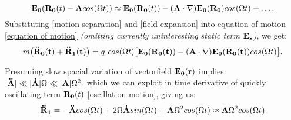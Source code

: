 \begin{equation}
	\label{field expansion}
	\vb{E_0}(\vb{R_0}(t) - \vb{A} cos(\Omega t)) \approx \vb{E_0}(\vb{R_0}(t)) -(\vb{A} \cdot \nabla) \vb{E_0}(\vb{R_0}) cos(\Omega t) + \dots.
\end{equation}
Substituting \eqref{motion separation} and \eqref{field expansion} into equation of motion \eqref{equation of motion} \textit{(omitting currently uninteresting static term $\vb{E_s}$)}, we get:
\begin{equation}
	m \big( \vb{\ddot{R}_0(t)} + \vb{\ddot{R}_1(t)} \big) = q \ cos(\Omega t) \big[ \vb{E_0(\vb{R_0}(t))} - (\vb{A} \cdot \nabla) \vb{E_0(\vb{R_0}(t))} cos(\Omega t)  \big].
\end{equation}

Presuming slow spacial variation of vectorfield $\vb{E_0}(\vb{r})$ implies: \\ $|\vb{\ddot{A}}| \ll |\vb{\dot{A}}| \Omega \ll |\vb{A}| \Omega^2$, which we can exploit in time derivative of quickly oscillating term $\vb{R_0}(t)$ \eqref{oscillation motion}, giving us:
\begin{equation}
	\vb{\ddot{R}_1} = - \vb{\ddot{A}} cos(\Omega t) + 2 \Omega \vb{\dot{A}} sin(\Omega t) + \vb{A} \Omega^2 cos(\Omega t) \approx \vb{A} \Omega^2 cos(\Omega t)
\end{equation}

